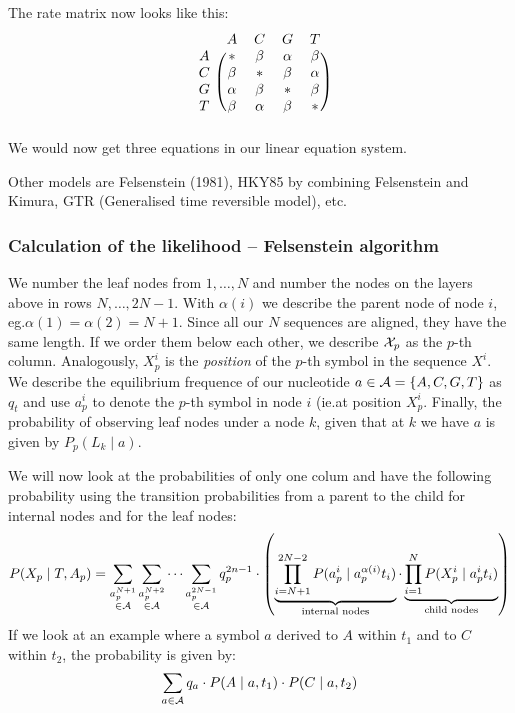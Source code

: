 The rate matrix now looks like this:
\[
\begin{blockarray}{ccccc}
  & A      & C      & G      & T \\
\begin{block}{c(cccc)}
A & *      & \beta  & \alpha & \beta  \\
C & \beta  & *      & \beta  & \alpha \\
G & \alpha & \beta  & *      & \beta  \\
T & \beta  & \alpha & \beta & *       \\
\end{block}
\end{blockarray}
\]
We would now get three equations in our linear equation system.

Other models are Felsenstein (1981), HKY85 by combining Felsenstein and
Kimura, GTR (Generalised time reversible model), etc\@.

\subsubsection{Calculation of the likelihood -- Felsenstein algorithm}

We number the leaf nodes from \(1,\dotsc,N\) and number the nodes on the
layers above in rows \(N,\dotsc,2N-1\).  With \(\alpha(i)\) we describe the
parent node of node \(i\), eg.\@ \(\alpha(1)=\alpha(2)=N+1\).  Since all our
\(N\) sequences are aligned, they have the same length.  If we order them
below each other, we describe \(\mathcal{X}_p\) as the \(p\)-th column.  Analogously,
\(X_p^i\) is the \emph{position} of the \(p\)-th symbol in the sequence \(X^i\).
We describe the equilibrium frequence of our nucleotide
\(a\in\mathcal{A}=\{A,C,G,T\}\) as \(q_t\) and use \(a_p^i\) to denote the
\(p\)-th symbol in node \(i\) (ie.\@ at position \(X_p^i\).  Finally,
the probability of observing leaf nodes under a node \(k\), given that at \(k\)
we have \(a\) is given by \(P_p(L_k \mid a)\).

We will now look at the probabilities of only one colum and have the following
probability using the transition probabilities from a parent to the child for
internal nodes and for the leaf nodes:
\[
  P(X_p \mid T, A_p) = \sum_{\substack{a_p^{N+1}\\\in\mathcal{A}}} \sum_{\substack{a_p^{N+2}\\\in\mathcal{A}}} \dotsb \sum_{\substack{a_p^{2N-1}\\\in\mathcal{A}}}
      q_p^{2n-1} \cdot \left(
      \underbrace{\prod_{i=N+1}^{2N-2} P(a_p^i \mid a_p^{\alpha(i)} t_i)}_{\text{internal nodes}} \cdot
      \underbrace{\prod_{i=1}^{N}      P(X_p^i \mid a_p^i           t_i)}_{\text{child nodes}} \right)
\]
If we look at an example where a symbol \(a\) derived to \(A\) within \(t_1\)
and to \(C\) within \(t_2\), the probability is given by:
\[
  \sum_{a\in\mathcal{A}} q_a \cdot P(A \mid a, t_1) \cdot P(C \mid a, t_2)
\]


